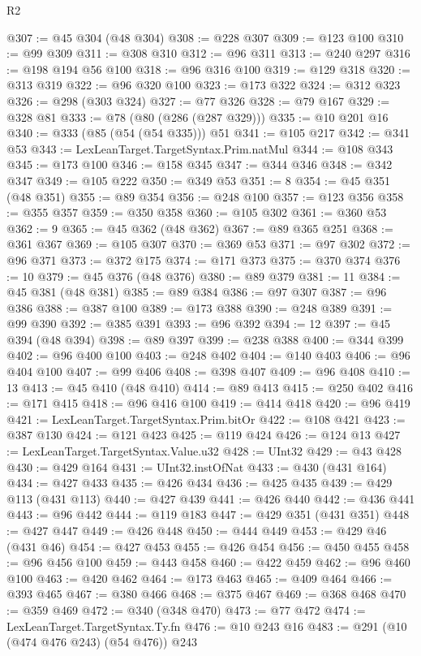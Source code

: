 \begin{lexlean}{R2}
\begin{coremodule}
@307 := @45 @304 (@48 @304)
@308 := @228 @307
@309 := @123 @100
@310 := @99 @309
@311 := @308 @310
@312 := @96 @311
@313 := @240 @297
@316 := @198 @194 @56 @100
@318 := @96 @316 @100
@319 := @129 @318
@320 := @313 @319
@322 := @96 @320 @100
@323 := @173 @322
@324 := @312 @323
@326 := @298 (@303 @324)
@327 := @77 @326
@328 := @79 @167
@329 := @328 @81
@333 := @78 (@80 (@286 (@287 @329)))
@335 := @10 @201 @16
@340 := @333 (@85 (@54 (@54 @335))) @51
@341 := @105 @217
@342 := @341 @53
@343 := LexLeanTarget.TargetSyntax.Prim.natMul
@344 := @108 @343
@345 := @173 @100
@346 := @158 @345
@347 := @344 @346
@348 := @342 @347
@349 := @105 @222
@350 := @349 @53
@351 := 8
@354 := @45 @351 (@48 @351)
@355 := @89 @354
@356 := @248 @100
@357 := @123 @356
@358 := @355 @357
@359 := @350 @358
@360 := @105 @302
@361 := @360 @53
@362 := 9
@365 := @45 @362 (@48 @362)
@367 := @89 @365 @251
@368 := @361 @367
@369 := @105 @307
@370 := @369 @53
@371 := @97 @302
@372 := @96 @371
@373 := @372 @175
@374 := @171 @373
@375 := @370 @374
@376 := 10
@379 := @45 @376 (@48 @376)
@380 := @89 @379
@381 := 11
@384 := @45 @381 (@48 @381)
@385 := @89 @384
@386 := @97 @307
@387 := @96 @386
@388 := @387 @100
@389 := @173 @388
@390 := @248 @389
@391 := @99 @390
@392 := @385 @391
@393 := @96 @392
@394 := 12
@397 := @45 @394 (@48 @394)
@398 := @89 @397
@399 := @238 @388
@400 := @344 @399
@402 := @96 @400 @100
@403 := @248 @402
@404 := @140 @403
@406 := @96 @404 @100
@407 := @99 @406
@408 := @398 @407
@409 := @96 @408
@410 := 13
@413 := @45 @410 (@48 @410)
@414 := @89 @413
@415 := @250 @402
@416 := @171 @415
@418 := @96 @416 @100
@419 := @414 @418
@420 := @96 @419
@421 := LexLeanTarget.TargetSyntax.Prim.bitOr
@422 := @108 @421
@423 := @387 @130
@424 := @121 @423
@425 := @119 @424
@426 := @124 @13
@427 := LexLeanTarget.TargetSyntax.Value.u32
@428 := UInt32
@429 := @43 @428
@430 := @429 @164
@431 := UInt32.instOfNat
@433 := @430 (@431 @164)
@434 := @427 @433
@435 := @426 @434
@436 := @425 @435
@439 := @429 @113 (@431 @113)
@440 := @427 @439
@441 := @426 @440
@442 := @436 @441
@443 := @96 @442
@444 := @119 @183
@447 := @429 @351 (@431 @351)
@448 := @427 @447
@449 := @426 @448
@450 := @444 @449
@453 := @429 @46 (@431 @46)
@454 := @427 @453
@455 := @426 @454
@456 := @450 @455
@458 := @96 @456 @100
@459 := @443 @458
@460 := @422 @459
@462 := @96 @460 @100
@463 := @420 @462
@464 := @173 @463
@465 := @409 @464
@466 := @393 @465
@467 := @380 @466
@468 := @375 @467
@469 := @368 @468
@470 := @359 @469
@472 := @340 (@348 @470)
@473 := @77 @472
@474 := LexLeanTarget.TargetSyntax.Ty.fn
@476 := @10 @243 @16
@483 := @291 (@10 (@474 @476 @243) (@54 @476)) @243

\end{coremodule}
\end{lexlean}
